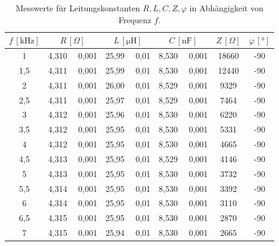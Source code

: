 \begin{table}[H]
	\centering
	\caption{Messwerte für Leitungskonstanten $R,L,C,Z,\varphi$ in Abhängigkeit von Frequenz $f$.}
	\label{tab:RCL}
	\begin{tabular}{c | c | c | c | c | c}
		\toprule
		$f \, [\mathrm{kHz}]$ & $R \, [\Omega]$ & $L \, [\mathrm{\mu H}]$ & $C \, [\mathrm{nF}]$ & $Z \, [\Omega]$ & $\varphi \, [°]$\\
		\midrule
		1 & 4,310  \, \clap{$\pm$} \,  0,001 & 25,99  \, \clap{$\pm$} \,  0,01 & 8,530  \, \clap{$\pm$} \,  0,001 & 18660 & -90 \\
		 1,5 & 4,311  \, \clap{$\pm$} \,  0,001 & 25,99  \, \clap{$\pm$} \,  0,01 & 8,530  \, \clap{$\pm$} \,  0,001 & 12440 & -90 \\
		 2 & 4,311  \, \clap{$\pm$} \,  0,001 & 26,00  \, \clap{$\pm$} \,  0,01 & 8,529  \, \clap{$\pm$} \,  0,001 & 9329 & -90 \\
		 2,5 & 4,311  \, \clap{$\pm$} \,  0,001 & 25,97  \, \clap{$\pm$} \,  0,01 & 8,529  \, \clap{$\pm$} \,  0,001 & 7464 & -90 \\
		 3 & 4,312  \, \clap{$\pm$} \,  0,001 & 25,96  \, \clap{$\pm$} \,  0,01 & 8,530  \, \clap{$\pm$} \,  0,001 & 6220 & -90 \\
		 3,5 & 4,312  \, \clap{$\pm$} \,  0,001 & 25,95  \, \clap{$\pm$} \,  0,01 & 8,530  \, \clap{$\pm$} \,  0,001 & 5331 & -90 \\
		 4 & 4,312  \, \clap{$\pm$} \,  0,001 & 25,95  \, \clap{$\pm$} \,  0,01 & 8,530  \, \clap{$\pm$} \,  0,001 & 4665 & -90 \\
		 4,5 & 4,313  \, \clap{$\pm$} \,  0,001 & 25,95  \, \clap{$\pm$} \,  0,01 & 8,529  \, \clap{$\pm$} \,  0,001 & 4146 & -90 \\
		 5 & 4,313  \, \clap{$\pm$} \,  0,001 & 25,95  \, \clap{$\pm$} \,  0,01 & 8,530  \, \clap{$\pm$} \,  0,001 & 3732 & -90 \\
		 5,5 & 4,314  \, \clap{$\pm$} \,  0,001 & 25,95  \, \clap{$\pm$} \,  0,01 & 8,530  \, \clap{$\pm$} \,  0,001 & 3392 & -90 \\
		 6 & 4,314  \, \clap{$\pm$} \,  0,001 & 25,95  \, \clap{$\pm$} \,  0,01 & 8,530  \, \clap{$\pm$} \,  0,001 & 3110 & -90 \\
		 6,5 & 4,315  \, \clap{$\pm$} \,  0,001 & 25,95  \, \clap{$\pm$} \,  0,01 & 8,530  \, \clap{$\pm$} \,  0,001 & 2870 & -90 \\
		 7 & 4,315  \, \clap{$\pm$} \,  0,001 & 25,94  \, \clap{$\pm$} \,  0,01 & 8,530  \, \clap{$\pm$} \,  0,001 & 2665 & -90 \\

\end{tabular}
\end{table}
